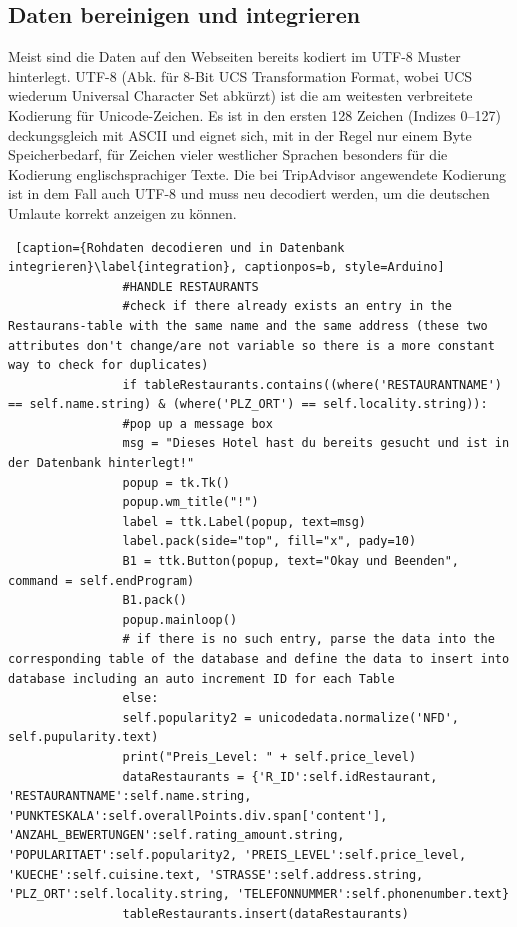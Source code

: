 \documentclass[a4paper,oneside,12pt]{report}
\begin{document}
			\subsection[Daten bereinigen und integrieren - Johannes Knippel]{Daten bereinigen und integrieren}
				
				Meist sind die Daten auf den Webseiten bereits kodiert im UTF-8 Muster hinterlegt. UTF-8 (Abk. für 8-Bit UCS Transformation Format, wobei UCS wiederum Universal Character Set abkürzt) ist die am weitesten verbreitete Kodierung für Unicode-Zeichen. Es ist in den ersten 128 Zeichen (Indizes 0–127) deckungsgleich mit ASCII und eignet sich, mit in der Regel nur einem Byte Speicherbedarf, für Zeichen vieler westlicher Sprachen besonders für die Kodierung englischsprachiger Texte. \cite{bib-utf8} Die bei TripAdvisor angewendete Kodierung ist in dem Fall auch UTF-8 und muss neu decodiert werden, um die deutschen Umlaute korrekt anzeigen zu können.
				\\
				\begin{lstlisting} [caption={Rohdaten decodieren und in Datenbank integrieren}\label{integration}, captionpos=b, style=Arduino]
				#HANDLE RESTAURANTS
				#check if there already exists an entry in the Restaurans-table with the same name and the same address (these two attributes don't change/are not variable so there is a more constant way to check for duplicates)
				if tableRestaurants.contains((where('RESTAURANTNAME') == self.name.string) & (where('PLZ_ORT') == self.locality.string)): 
				#pop up a message box
				msg = "Dieses Hotel hast du bereits gesucht und ist in der Datenbank hinterlegt!"
				popup = tk.Tk()
				popup.wm_title("!")
				label = ttk.Label(popup, text=msg)
				label.pack(side="top", fill="x", pady=10)
				B1 = ttk.Button(popup, text="Okay und Beenden", command = self.endProgram)
				B1.pack()
				popup.mainloop()
				# if there is no such entry, parse the data into the corresponding table of the database and define the data to insert into database including an auto increment ID for each Table       
				else:
				self.popularity2 = unicodedata.normalize('NFD', self.pupularity.text)
				print("Preis_Level: " + self.price_level)
				dataRestaurants = {'R_ID':self.idRestaurant, 'RESTAURANTNAME':self.name.string, 'PUNKTESKALA':self.overallPoints.div.span['content'], 'ANZAHL_BEWERTUNGEN':self.rating_amount.string, 'POPULARITAET':self.popularity2, 'PREIS_LEVEL':self.price_level, 'KUECHE':self.cuisine.text, 'STRASSE':self.address.string, 'PLZ_ORT':self.locality.string, 'TELEFONNUMMER':self.phonenumber.text}
				tableRestaurants.insert(dataRestaurants)
				\end{lstlisting}
				
\end{document}
